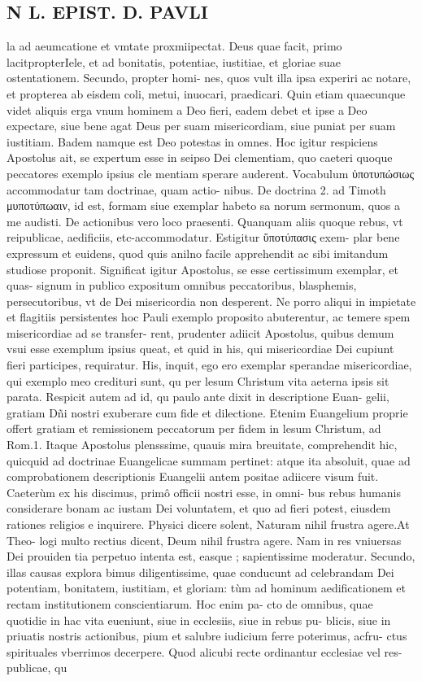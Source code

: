 \documentclass{article}
\begin{document}
\begin{pages}
\section*{N L. EPIST. D. PAVLI }
\marginpar{[ p.56 ]}\pstart la ad aeumcatione et vmtate proxmiipectat. Deus quae facit, primo lacitpropterIele, et ad bonitatis, potentiae, iustitiae, et gloriae suae ostentationem. Secundo, propter homi- nes, quos vult illa ipsa experiri ac notare, et propterea ab eisdem coli, metui, inuocari, praedicari. Quin etiam quaecunque  videt aliquis erga vnum hominem a Deo fieri, eadem debet et ipse a Deo expectare, siue bene agat Deus per suam misericordiam, siue puniat per suam iustitiam. Badem namque  est Deo potestas in omnes. Hoc igitur respiciens Apostolus ait, se expertum esse in seipso Dei clementiam, quo caeteri quoque  peccatores exemplo ipsius cle mentiam sperare auderent. Vocabulum ὐποτυπώσιως accommodatur tam doctrinae, quam actio- nibus. De doctrina 2. ad Timoth μυποτύπωαιν, id est, formam siue exemplar habeto sa norum sermonum, quos a me audisti. De actionibus vero loco praesenti. Quanquam aliis quoque  rebus, vt reipublicae, aedificiis, etc-accommodatur. Estigitur ὕποτύπασις exem- plar bene expressum et euidens, quod quis anilno facile apprehendit ac sibi imitandum studiose proponit. Significat igitur Apostolus, se esse certissimum exemplar, et quas- signum in publico expositum omnibus peccatoribus, blasphemis, persecutoribus, vt de Dei misericordia non desperent. Ne porro aliqui in impietate et flagitiis persistentes hoc Pauli exemplo proposito abuterentur, ac temere spem misericordiae ad se transfer- rent, prudenter adiicit Apostolus, quibus demum vsui esse exemplum ipsius queat, et quid in his, qui misericordiae Dei cupiunt fieri participes, requiratur. His, inquit, ego ero exemplar sperandae misericordiae, qui exemplo meo credituri sunt, qu per lesum Christum vita aeterna ipsis sit parata. Respicit autem ad id, qu paulo ante dixit in descriptione Euan- gelii, gratiam Dñi nostri exuberare cum fide et dilectione. Etenim Euangelium proprie offert gratiam et remissionem peccatorum per fidem in lesum Christum, ad Rom.1. Itaque  Apostolus plensssime, quauis mira breuitate, comprehendit hic, quicquid ad doctrinae Euangelicae summam pertinet: atque  ita absoluit, quae ad comprobationem descriptionis Euangelii antem positae adiicere visum fuit. Caeterùm ex his discimus, primô officii nostri esse, in omni- bus rebus humanis considerare bonam ac iustam Dei voluntatem, et quo ad fieri potest, eiusdem rationes religios e inquirere. Physici dicere solent, Naturam nihil frustra agere.At Theo- logi multo rectius dicent, Deum nihil frustra agere. Nam in res vniuersas Dei prouiden tia perpetuo intenta est, easque ; sapientissime moderatur. Secundo, illas causas explora bimus diligentissime, quae conducunt ad celebrandam Dei potentiam, bonitatem, iustitiam, et gloriam: tùm ad hominum aedificationem et rectam institutionem conscientiarum. Hoc enim pa- cto de omnibus, quae quotidie in hac vita eueniunt, siue in ecclesiis, siue in rebus pu- blicis, siue in priuatis nostris actionibus, pium et salubre iudicium ferre poterimus, acfru- ctus spirituales vberrimos decerpere. Quod alicubi recte ordinantur ecclesiae vel res- publicae, qu 
\end{pages}
\end{document}
